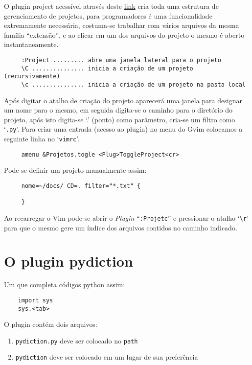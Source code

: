O plugin project acessível através deste \href{http://www.vim.org/scripts/script.php?script\_id=69}{link}
cria toda uma estrutura de gerenciamento de projetos, para programadores é uma funcionalidade
extremamente necessária, costuma-se trabalhar com vários arquivos da mesma família ``extensão'', 
e ao clicar em um dos arquivos do projeto o mesmo é aberto instantaneamente.

\begin{verbatim}
     :Project ......... abre uma janela lateral para o projeto
     \C ............... inicia a criação de um projeto (recursivamente)
     \c ............... inicia a criação de um projeto na pasta local
\end{verbatim}

Após digitar o atalho de criação do projeto aparecerá uma janela para designar um nome
para o mesmo, em seguida digita-se o caminho para o diretório do projeto, após isto
digita-se `.' (ponto) como parâmetro, cria-se um filtro como `{\tt *.py}'.
Para criar uma entrada (acesso ao plugin) no menu do Gvim colocamos
a seguinte linha no `{\tt vimrc}'.

\begin{verbatim}
     amenu &Projetos.togle <Plug>ToggleProject<cr>
\end{verbatim}

Pode-se definir um projeto manualmente assim:

\begin{verbatim}
     nome=~/docs/ CD=. filter="*.txt" {

     }
\end{verbatim}

Ao recarregar o Vim pode-se abrir o {\em Plugin} ``{\tt :Projetc}'' e 
pressionar o atalho `\verb+\r+' para que o mesmo gere um índice dos arquivos
contidos no caminho indicado.
   

\section{O plugin pydiction}
\label{sec:O plugin pydiction}

Um que completa códigos python assim:

\begin{verbatim}
    import sys
    sys.<tab>
\end{verbatim}

O plugin contém dois arquivos:

\begin{enumerate}
    \item {\tt pydiction.py} deve ser colocado no {\tt path}
    \item {\tt pydiction} deve ser colocado em um lugar de sua preferência
\end{enumerate}


